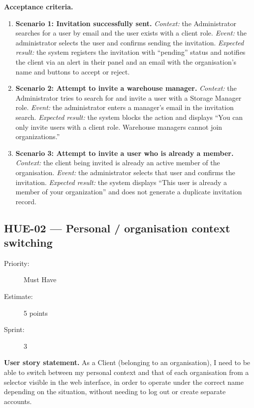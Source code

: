 \documentclass[11pt,a4paper,oneside]{report}
\begin{document}
\textbf{Acceptance criteria.}
\begin{enumerate}
\item \textbf{Scenario 1: Invitation successfully sent.} \emph{Context:} the Administrator searches for a user by email and the user exists with a client role. \emph{Event:} the administrator selects the user and confirms sending the invitation. \emph{Expected result:} the system registers the invitation with ``pending'' status and notifies the client via an alert in their panel and an email with the organisation's name and buttons to accept or reject.
\item \textbf{Scenario 2: Attempt to invite a warehouse manager.} \emph{Context:} the Administrator tries to search for and invite a user with a Storage Manager role. \emph{Event:} the administrator enters a manager's email in the invitation search. \emph{Expected result:} the system blocks the action and displays ``You can only invite users with a client role. Warehouse managers cannot join organizations.''
\item \textbf{Scenario 3: Attempt to invite a user who is already a member.} \emph{Context:} the client being invited is already an active member of the organisation. \emph{Event:} the administrator selects that user and confirms the invitation. \emph{Expected result:} the system displays ``This user is already a member of your organization'' and does not generate a duplicate invitation record.
\end{enumerate}

\subsection{HUE-02 --- Personal / organisation context switching}
\label{req:HUE-02}
\begin{description}
\item[Priority:] Must Have \quad \item[Estimate:] 5 points \quad \item[Sprint:] 3
\end{description}

\textbf{User story statement.} As a Client (belonging to an organisation), I need to be able to switch between my personal context and that of each organisation from a selector visible in the web interface, in order to operate under the correct name depending on the situation, without needing to log out or create separate accounts.
\end{document}
